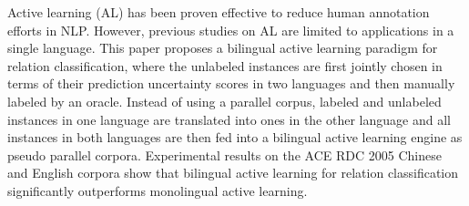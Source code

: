 Active learning (AL) has been proven effective to reduce human annotation efforts in NLP. However, previous studies on AL are limited to applications in a single language. This paper proposes a bilingual active learning paradigm for relation classification, where the unlabeled instances are first jointly chosen in terms of their prediction uncertainty scores in two languages and then manually labeled by an oracle. Instead of using a parallel corpus, labeled and unlabeled instances in one language are translated into ones in the other language and all instances in both languages are then fed into a bilingual active learning engine as pseudo parallel corpora. Experimental results on the ACE RDC 2005 Chinese and English corpora show that bilingual active learning for relation classification significantly outperforms monolingual active learning.
